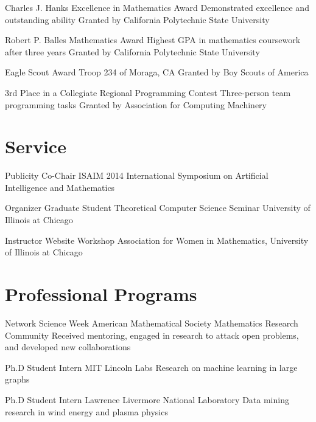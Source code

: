 \documentclass[11pt]{moderncv}
\begin{document}
         {Charles J. Hanks Excellence in Mathematics Award}
      {Demonstrated excellence and outstanding ability}
      {Granted by California Polytechnic State University}
      {}
{}

         {Robert P. Balles Mathematics Award}
      {Highest GPA in mathematics coursework after three years}
      {Granted by California Polytechnic State University}
      {}
{}

         {Eagle Scout Award}
      {Troop 234 of Moraga, CA}
      {Granted by Boy Scouts of America}
      {}
{}

         {3rd Place in a Collegiate Regional Programming Contest}
      {Three-person team programming tasks}
      {Granted by Association for Computing Machinery}
      {}
{}


   \section{Service}
         {Publicity Co-Chair}
      {ISAIM 2014}
      {International Symposium on Artificial Intelligence and Mathematics}
      {}
{}

         {Organizer}
      {Graduate Student Theoretical Computer Science Seminar}
      {University of Illinois at Chicago}
      {}
{}

         {Instructor}
      {Website Workshop}
      {Association for Women in Mathematics, University of Illinois at Chicago}
      {}
{}


   \section{Professional Programs}
         {Network Science Week}
      {American Mathematical Society Mathematics Research Community}
      {}
      {}
      {Received mentoring, engaged in research to attack open problems, and developed new collaborations}

         {Ph.D Student Intern}
      {MIT Lincoln Labs}
      {}
      {}
      {Research on machine learning in large graphs}

         {Ph.D Student Intern}
      {Lawrence Livermore National Laboratory}
      {}
      {}
      {Data mining research in wind energy and plasma physics}
\end{document}
